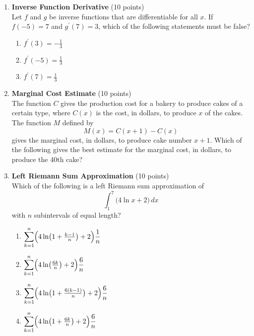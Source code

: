\begin{enumerate}
  \item \textbf{Inverse Function Derivative} (10 points)\\
  Let $f$ and $g$ be inverse functions that are differentiable for all $x$. If $f(-5)=7$ and $g^{\prime}(7)=3$, which of the following statements must be false?
  \begin{enumerate}[label=(\Roman*)]
    \item $f^{\prime}(3)=-\frac{1}{3}$
    \item $f^{\prime}(-5)=\frac{1}{3}$
    \item $f^{\prime}(7)=\frac{1}{3}$
  \end{enumerate}
  \begin{subanswer}
  \end{subanswer}

  \item \textbf{Marginal Cost Estimate} (10 points)\\
  The function $C$ gives the production cost for a bakery to produce cakes of a certain type, where $C(x)$ is the cost, in dollars, to produce $x$ of the cakes. The function $M$ defined by
  \[
    M(x)=C(x+1)-C(x)
  \]
  gives the marginal cost, in dollars, to produce cake number $x+1$. Which of the following gives the best estimate for the marginal cost, in dollars, to produce the 40th cake?
  \begin{subanswer}
  \end{subanswer}

  \item \textbf{Left Riemann Sum Approximation} (10 points)\\
  Which of the following is a left Riemann sum approximation of
  \[
    \int_1^7\bigl(4 \ln x + 2\bigr)\,dx
  \]
  with $n$ subintervals of equal length?
  \begin{enumerate}[label=(\Alph*)]
    \item $\displaystyle \sum_{k=1}^n\Bigl(4 \ln\bigl(1+\tfrac{k-1}{n}\bigr)+2\Bigr)\frac{1}{n}$
    \item $\displaystyle \sum_{k=1}^n\Bigl(4 \ln\bigl(\tfrac{6k}{n}\bigr)+2\Bigr)\frac{6}{n}$
    \item $\displaystyle \sum_{k=1}^n\Bigl(4 \ln\bigl(1+\tfrac{6(k-1)}{n}\bigr)+2\Bigr)\frac{6}{n}$
    \item $\displaystyle \sum_{k=1}^n\Bigl(4 \ln\bigl(1+\tfrac{6k}{n}\bigr)+2\Bigr)\frac{6}{n}$
  \end{enumerate}
  \begin{subanswer}
  \end{subanswer}


\end{enumerate}
